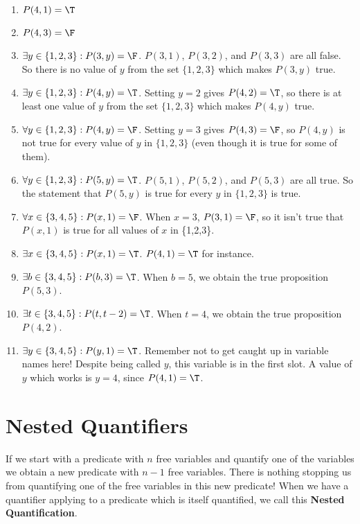 \begin{solutions}



		\begin{enumerate}
	\item $P(4,1) = \T$
	\item $P(4,3) = \F $
	\item $\exists y \in \{1,2,3\}: P(3,y) = \F$.  $P(3,1)$, $P(3,2)$, and $P(3,3)$ are all false.  So there is no value of $y$ from the set $\{1,2,3\}$ which makes $P(3,y)$ true.
	\item $\exists y  \in \{1,2,3\}: P(4,y) = \T$.  Setting $y=2$ gives $P(4,2) = \T$, so there is at least one value of $y$ from the set $\{1,2,3\}$ which makes $P(4,y)$ true.
	\item $\forall y  \in \{1,2,3\}: P(4,y) = \F$. Setting  $y = 3$ gives $P(4,3) = \F$, so $P(4,y)$ is not true for every value of $y$ in $\{1,2,3\}$ (even though it is true for some of them).
	\item $\forall y  \in \{1,2,3\}: P(5,y) = \T$.  $P(5,1)$, $P(5,2)$, and $P(5,3)$ are all true.  So the statement that $P(5,y)$ is true for every $y$ in $\{1,2,3\}$ is true.
	\item $\forall x  \in \{3,4,5\}: P(x, 1) = \F$.  When $x = 3$, $P(3, 1) = \F$, so it isn't true that $P(x,1)$ is true for all values of $x$ in \{1,2,3\}.
	\item $\exists x  \in \{3,4,5\}: P(x,1) = \T$.  $P(4,1) = \T$ for instance.
	\item $\exists b  \in \{3,4,5\}: P(b, 3) = \T$.  When $b = 5$, we obtain the true proposition $P(5,3)$.
	\item $\exists t  \in \{3,4,5\}: P(t, t-2) = \T$.  When $t = 4$, we obtain the true proposition $P(4,2)$.  
	\item $\exists y  \in \{3,4,5\}: P(y,1) = \T$.  Remember not to get caught up in variable names here!  Despite being called $y$, this variable is in the first slot.  A value of $y$ which works is $y = 4$, since $P(4,1) = \T$. 
\end{enumerate}
	
	\end{solutions}

\section{Nested Quantifiers}

If we start with a predicate with $n$ free variables and quantify one of the variables we obtain a new predicate with $n-1$ free variables.  There is nothing stopping us from quantifying one of the free variables in this new predicate!  When we have a quantifier applying to a predicate which is itself quantified, we call this  \textbf{Nested Quantification}.

